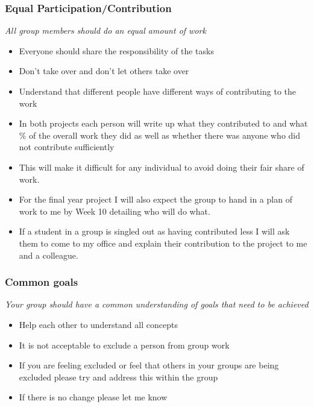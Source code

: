 \documentclass[
]{gitbook}
\providecommand{\tightlist}{%
  \setlength{\itemsep}{0pt}\setlength{\parskip}{0pt}}
\begin{document}
\hypertarget{equal-participationcontribution}{%
\subsubsection{Equal Participation/Contribution}\label{equal-participationcontribution}}

\emph{All group members should do an equal amount of work}

\begin{itemize}
\tightlist
\item
  Everyone should share the responsibility of the tasks
\item
  Don't take over and don't let others take over
\item
  Understand that different people have different ways of contributing to the work
\item
  In both projects each person will write up what they contributed to and what \% of the overall work they did as well as whether there was anyone who did not contribute sufficiently
\item
  This will make it difficult for any individual to avoid doing their fair share of work.
\item
  For the final year project I will also expect the group to hand in a plan of work to me by Week 10 detailing who will do what.
\item
  If a student in a group is singled out as having contributed less I will ask them to come to my office and explain their contribution to the project to me and a colleague.
\end{itemize}

\hypertarget{common-goals}{%
\subsubsection{Common goals}\label{common-goals}}

\emph{Your group should have a common understanding of goals that need to be achieved}

\begin{itemize}
\tightlist
\item
  Help each other to understand all concepts
\item
  It is not acceptable to exclude a person from group work
\item
  If you are feeling excluded or feel that others in your groups are being excluded please try and address this within the group
\item
  If there is no change please let me know
\end{itemize}
\end{document}
